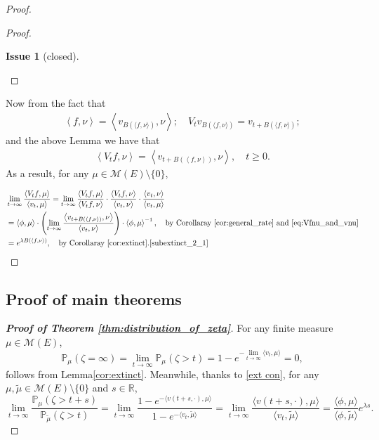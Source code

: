 \documentclass[12pt,a4paper]{amsart}
\numberwithin{equation}{section}
\theoremstyle{plain}
\theoremstyle{definition}
\newtheorem{iss}{Issue}
\begin{document}
\begin{proof}
\begin{proof}
\begin{iss}[closed]
  \end{iss} 
\end{proof}
  Now from the fact that 
  \begin{align}
    \left\langle f, \nu \right\rangle
    = \left\langle v_{B(\langle  f,\nu\rangle)},\nu \right\rangle;
\quad 
    V_t v_{B(\langle f,\nu \rangle)} = v_{t+ B(\langle f,\nu\rangle)};
  \end{align}
  and the above Lemma we have that
  \begin{align}
\label{eq:Vfnu_and_vnu}
    \left\langle V_tf,\nu \right\rangle 
    = \left\langle v_{t+B(\left\langle f,\nu \right\rangle)}, \nu \right\rangle,
\quad t\geq 0.
  \end{align}
As a result, for any $\mu\in\mathcal M(E)\setminus\{0\}$,

\begin{align}
  &\lim_{t\to \infty}\frac{\left\langle V_tf, \mu \right\rangle}{\left\langle v_t,\mu \right\rangle}
  = \lim_{t\to \infty} \frac{\left\langle V_tf,\mu \right\rangle}{\left\langle V_tf,\nu \right\rangle} \cdot \frac{\left\langle V_tf,\nu \right\rangle}{\left\langle v_t,\nu \right\rangle} \cdot \frac{\left\langle v_t,\nu \right\rangle}{\left\langle v_t,\mu \right\rangle}
  \\&= \left\langle \phi,\mu \right\rangle \cdot \left(\lim_{t\to \infty}\frac{\left\langle v_{t+B(\left\langle f,\nu \right\rangle)}, \nu \right\rangle}{ \left\langle v_t,\nu \right\rangle}\right) \cdot \left\langle \phi,\mu \right\rangle^{-1},\quad\text{by~Corollaray \ref{cor:general_rate} and \eqref{eq:Vfnu_and_vnu}}
  \\& = e^{\lambda B(\left\langle f, \nu \right\rangle)},\quad\text{by~Corollaray \ref{cor:extinct}.\eqref{subextinct_2_1}}
\end{align}
\end{proof}

\subsection{Proof of main theorems}
\begin{proof}[{\bf Proof of Theorem \ref{thm:distribution_of_zeta}}]
	For any finite measure $\mu\in \mathcal M(E)$,
  \[
    \mathbb P_\mu(\zeta=\infty)=\lim_{t\rightarrow\infty}\mathbb P_\mu(\zeta>t)=1-e^{-\lim_{t\rightarrow\infty}\langle v_t,\mu\rangle }=0,
  \]
	follows from Lemma\ref{cor:extinct}.
	Meanwhile, thanks to \eqref{ext con}, for any $\mu,\widetilde\mu\in \mathcal M(E)\setminus\{0\}$ and $s\in\mathbb R$,
  \[
    \lim_{t\rightarrow\infty}\frac{\mathbb P_{\mu}(\zeta>t+s)}{\mathbb P_{\widetilde\mu}(\zeta>t)}=\lim_{t\rightarrow\infty}\frac{1-e^{-\langle v(t+s,\cdot),\mu\rangle }}{1-e^{-\langle v_t,\widetilde\mu\rangle }}
    =\lim_{t\rightarrow\infty}\frac{\langle v(t+s,\cdot),\mu\rangle }{\langle v_t,\widetilde\mu\rangle }=\frac{\langle \phi,\mu\rangle }{\langle \phi,\widetilde\mu\rangle }e^{\lambda s}.
  \]
\end{proof}
\end{document}
